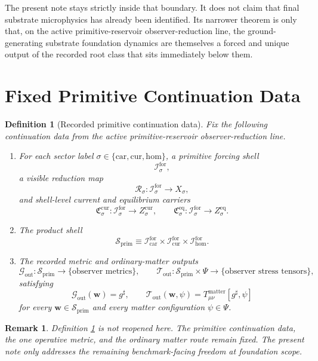 \documentclass[11pt]{article}
\newcommand{\CompletedMetric}{g^{\sharp}}
\newcommand{\MatterSpace}{\Psi}
\newcommand{\Car}{\mathrm{car}}
\newcommand{\Cur}{\mathrm{cur}}
\newcommand{\Hom}{\mathrm{hom}}
\newcommand{\ForSpace}[1]{\mathcal I_{#1}^{\mathrm{for}}}
\newcommand{\PrimShell}{\mathcal S_{\mathrm{prim}}}
\newcommand{\Reduction}[1]{\mathcal R_{#1}}
\newcommand{\CurrentCarrier}[1]{\mathfrak C_{#1}^{\mathrm{cur}}}
\newcommand{\EqCarrier}[1]{\mathfrak C_{#1}^{\mathrm{eq}}}
\newcommand{\MetricOut}{\mathscr G_{\mathrm{out}}}
\newcommand{\MatterOut}{\mathscr T_{\mathrm{out}}}
\newtheorem{definition}{Definition}
\newtheorem{remark}{Remark}
\begin{document}
The present note stays strictly inside that boundary. It does not claim that final substrate microphysics has already been identified. Its narrower theorem is only that, on the active primitive-reservoir observer-reduction line, the ground-generating substrate foundation dynamics are themselves a forced and unique output of the recorded root class that sits immediately below them.

\section{Fixed Primitive Continuation Data}

\begin{definition}[Recorded primitive continuation data]
\label{def:fixed}
Fix the following continuation data from the active primitive-reservoir observer-reduction line.
\begin{enumerate}
    \item For each sector label \(\sigma\in\{\Car,\Cur,\Hom\}\), a primitive forcing shell
    \[
    \ForSpace{\sigma},
    \]
    a visible reduction map
    \[
    \Reduction{\sigma}:\ForSpace{\sigma}\to X_{\sigma},
    \]
    and shell-level current and equilibrium carriers
    \[
    \CurrentCarrier{\sigma}:\ForSpace{\sigma}\to Z_{\sigma}^{\mathrm{cur}},
    \qquad
    \EqCarrier{\sigma}:\ForSpace{\sigma}\to Z_{\sigma}^{\mathrm{eq}}.
    \]
    \item The product shell
    \[
    \PrimShell
    \equiv
    \ForSpace{\Car}\times \ForSpace{\Cur}\times \ForSpace{\Hom}.
    \]
    \item The recorded metric and ordinary-matter outputs
    \[
    \MetricOut:\PrimShell\to\{\text{observer metrics}\},
    \qquad
    \MatterOut:\PrimShell\times\MatterSpace\to\{\text{observer stress tensors}\},
    \]
    satisfying
    \begin{equation}
    \MetricOut(\mathbf w)=\CompletedMetric,
    \qquad
    \MatterOut(\mathbf w,\psi)
    =
    T_{\mu\nu}^{\mathrm{matter}}[\CompletedMetric,\psi]
    \label{eq:fixedoutputs}
    \end{equation}
    for every \(\mathbf w\in\PrimShell\) and every matter configuration \(\psi\in\MatterSpace\).
\end{enumerate}
\end{definition}

\begin{remark}
Definition \ref{def:fixed} is not reopened here. The primitive continuation data, the one operative metric, and the ordinary matter route remain fixed. The present note only addresses the remaining benchmark-facing freedom at foundation scope.
\end{remark}
\end{document}
